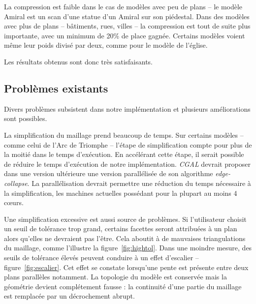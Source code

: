 ﻿\documentclass[12pt, twoside]{article}
\begin{document}
La compression est faible dans le cas de modèles avec peu de plans -- le modèle Amiral est un scan d'une statue d'un Amiral sur son piédestal. Dans des modèles avec plus de plans -- bâtiments, rues, villes -- la compression est tout de suite plus importante, avec un minimum de 20\% de place gagnée. Certains modèles voient même leur poids divisé par deux, comme pour le modèle de l'église.

Les résultats obtenus sont donc très satisfaisants.

\subsection{Problèmes existants}
Divers problèmes subsistent dans notre implémentation et plusieurs améliorations sont possibles.

La simplification du maillage prend beaucoup de temps. Sur certains modèles -- comme celui de l'Arc de Triomphe -- l'étape de simplification compte pour plus de la moitié dans le temps d'exécution. En accélérant cette étape, il serait possible de réduire le temps d'exécution de notre implémentation. \textit{CGAL} devrait proposer dans une version ultérieure une version parallélisée de son algorithme \textit{edge-collapse}. La parallélisation devrait permettre une réduction du temps nécessaire à la simplification, les machines actuelles possédant pour la plupart au moins 4 c\oe{}urs.

Une simplification excessive est aussi source de problèmes. Si l'utilisateur choisit un seuil de tolérance trop grand, certains facettes seront attribuées à un plan alors qu'elles ne devraient pas l'être. Cela aboutit à de mauvaises triangulations du maillage, comme l'illustre la figure~\ref{fig:hightol}. Dans une moindre mesure, des seuils de tolérance élevés peuvent conduire à un effet d'escalier -- figure~\ref{fig:escalier}. Cet effet se constate lorsqu'une pente est présente entre deux plans parallèles notamment. La topologie du modèle est conservée mais la géométrie devient complétement fausse : la continuité d'une partie du maillage est remplacée par un décrochement abrupt.
\end{document}
